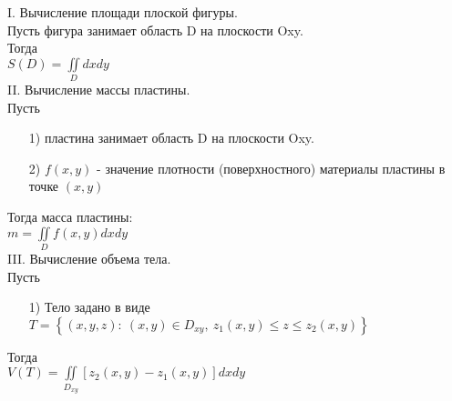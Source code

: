 
I. Вычисление площади плоской фигуры. \\

Пусть фигура занимает область D на плоскости Oxy. \\
Тогда \\
$\displaystyle S(D) = \iint\limits_{D} dxdy$ \\


II. Вычисление массы пластины. \\

Пусть \\
\begin{enumerate}
\item[1)] пластина занимает область D на плоскости Oxy. \\

\item[2)] $f(x,y)$ - значение плотности (поверхностного) материалы пластины в точке $(x,y)$ \\
\end{enumerate}
Тогда масса пластины: \\
$\displaystyle  m = \iint\limits_{D} f(x,y) dxdy$ \\


III. Вычисление объема тела. \\
Пусть \\
\begin{enumerate}
\item[1)] Тело задано в виде \\
$T = \left\{ (x,y,z): \ (x,y) \in D_{xy}, \ z_1(x,y) \leqslant z \leqslant z_2(x,y) \right\}$ \\
\end{enumerate}
Тогда \\
$\displaystyle  V(T) = \iint\limits_{D_{xy}} \left[ z_2(x,y) - z_1(x,y) \right] dxdy$ \\


